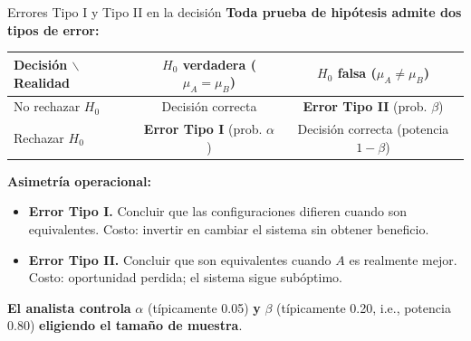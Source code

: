 \documentclass[aspectratio=1610, 10pt]{beamer}
\begin{document}
\begin{frame}{Errores Tipo I y Tipo II en la decisión}
\textbf{Toda prueba de hipótesis admite dos tipos de error:}

\vspace{0.2cm}
\begin{table}
\centering
\small
\begin{tabular}{l|cc}
\toprule
\textbf{Decisión $\backslash$ Realidad} & $H_0$ verdadera ($\mu_A = \mu_B$) & $H_0$ falsa ($\mu_A \neq \mu_B$) \\
\midrule
No rechazar $H_0$ & Decisión correcta & \textcolor{red!70!black}{\textbf{Error Tipo II}} (prob. $\beta$) \\
Rechazar $H_0$    & \textcolor{red!70!black}{\textbf{Error Tipo I}} (prob. $\alpha$) & Decisión correcta (potencia $1-\beta$) \\
\bottomrule
\end{tabular}
\end{table}

\vspace{0.3cm}
\textbf{Asimetría operacional:}
\begin{itemize}
\item \textbf{Error Tipo I.} Concluir que las configuraciones difieren cuando son equivalentes. Costo: invertir en cambiar el sistema sin obtener beneficio.
\item \textbf{Error Tipo II.} Concluir que son equivalentes cuando $A$ es realmente mejor. Costo: oportunidad perdida; el sistema sigue subóptimo.
\end{itemize}

\vspace{0.2cm}
\textbf{El analista controla} $\alpha$ (típicamente 0.05) \textbf{y} $\beta$ (típicamente 0.20, i.e., potencia 0.80) \textbf{eligiendo el tamaño de muestra}.
\end{frame}
\end{document}

